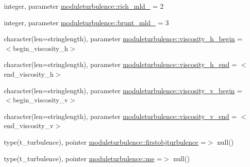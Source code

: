 \begin{DoxyCompactItemize}
\item 
integer, parameter \mbox{\hyperlink{namespacemoduleturbulence_a7b1c6356cf135cccdc1fa4593c7a8e7e}{moduleturbulence\+::rich\+\_\+mld\+\_\+}} = 2
\item 
integer, parameter \mbox{\hyperlink{namespacemoduleturbulence_a8c9c8f005ce1bb83a3e5a8cebd69bae4}{moduleturbulence\+::brunt\+\_\+mld\+\_\+}} = 3
\item 
character(len=stringlength), parameter \mbox{\hyperlink{namespacemoduleturbulence_a860d5ece29b255ab5d250a33b6b5106c}{moduleturbulence\+::viscosity\+\_\+h\+\_\+begin}} = \textquotesingle{}$<$begin\+\_\+viscosity\+\_\+h$>$\textquotesingle{}
\item 
character(len=stringlength), parameter \mbox{\hyperlink{namespacemoduleturbulence_a134ebac9140a7aa6099ca4888f990ea8}{moduleturbulence\+::viscosity\+\_\+h\+\_\+end}} = \textquotesingle{}$<$end\+\_\+viscosity\+\_\+h$>$\textquotesingle{}
\item 
character(len=stringlength), parameter \mbox{\hyperlink{namespacemoduleturbulence_aa207229e0ff82c7ac123a9b078a51f6a}{moduleturbulence\+::viscosity\+\_\+v\+\_\+begin}} = \textquotesingle{}$<$begin\+\_\+viscosity\+\_\+v$>$\textquotesingle{}
\item 
character(len=stringlength), parameter \mbox{\hyperlink{namespacemoduleturbulence_a2b0fb2fa55418700724ffc5e0f294858}{moduleturbulence\+::viscosity\+\_\+v\+\_\+end}} = \textquotesingle{}$<$end\+\_\+viscosity\+\_\+v$>$\textquotesingle{}
\item 
type(t\+\_\+turbulence), pointer \mbox{\hyperlink{namespacemoduleturbulence_af5759b7ab5d1b988fb35e62f93a6d7ed}{moduleturbulence\+::firstobjturbulence}} =$>$ null()
\item 
type(t\+\_\+turbulence), pointer \mbox{\hyperlink{namespacemoduleturbulence_aa8a18b46ae48dcd9b22bd9078b5f6c72}{moduleturbulence\+::me}} =$>$ null()
\end{DoxyCompactItemize}
